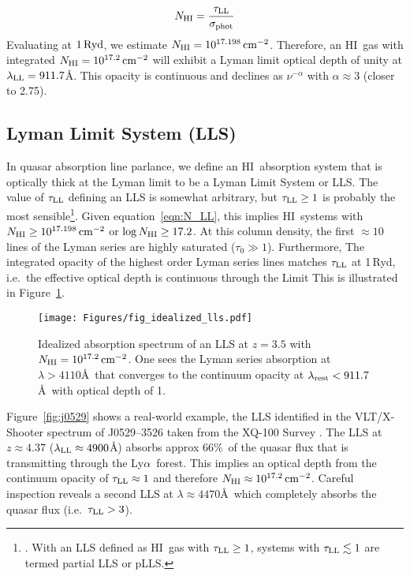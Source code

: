 \documentclass[graybox]{svmult}
\newcommand{\HI}{H{\sc I}}
\def\lya{Ly$\alpha$}
\newcommand{\mnhi}{N_{\rm HI}}
\def\cm#1{\, {\rm cm^{#1}}}
\begin{document}
\begin{equation}
N_{\rm HI} = \frac{\tau_{\rm LL}}{\sigma_{\rm phot}}
\label{eqn:N_LL}
\end{equation}
Evaluating at $1\,{\rm Ryd}$, we estimate $\mnhi = 10^{17.198} \cm{-2}$.
Therefore, an \HI\ gas with integrated $\mnhi = 10^{17.2} \cm{-2}$
will exhibit a Lyman limit optical depth of unity
at $\lambda_{\rm LL} = 911.7$\AA.  This opacity is continuous
and declines as $\nu^{-\alpha}$ with $\alpha \approx 3$ (closer to 2.75).

\subsection{Lyman Limit System (LLS)}

In quasar absorption line parlance, we define 
an \HI\ absorption system that is optically thick at the Lyman limit
to be a Lyman Limit System or LLS.
The value of $\tau_{\rm LL}$ defining an LLS is somewhat arbitrary,
but $\tau_{\rm LL} \ge 1$ is probably the most sensible\footnote{.  
With an LLS defined as \HI\ gas with $\tau_{\rm LL} \ge 1$,
systems with $\tau_{\rm LL} \lesssim 1$ are termed partial
LLS or pLLS.}.  
Given equation~\ref{eqn:N_LL},
this implies \HI\ systems with $\mnhi \ge 10^{17.198} \cm{-2}$ or 
$\log\mnhi \ge 17.2$.
At this column density, the first $\approx 10$ lines of the
Lyman series are highly saturated ($\tau_0 \gg 1$).
Furthermore, 
The integrated opacity of the highest order Lyman series lines
matches $\tau_{\rm LL}$ at 1\,Ryd,
i.e.\ the effective optical depth is continuous through the Limit
This is illustrated in Figure~\ref{fig:ideal_LLS}.

%
\begin{figure}[ht]
\sidecaption
\texttt{[image: Figures/fig\_idealized\_lls.pdf]}
%
%
\caption{Idealized absorption spectrum of an LLS at $z=3.5$
with $\mnhi = 10^{17.2} \cm{-2}$. One sees the Lyman series
absorption at $\lambda > 4110$\AA\ that converges to the
continuum opacity at $\lambda_{\rm rest} < 911.7$\AA\
with optical depth of 1.
}
\label{fig:ideal_LLS}       %
\end{figure}

Figure~\ref{fig:j0529} shows a real-world example, the
LLS identified in the VLT/X-Shooter spectrum of 
J0529--3526 taken from the XQ-100 Survey \cite[]{xq_100}.
The LLS at $z \approx 4.37$ ($\lambda_{\rm LL} \approx 4900$\AA)
absorbs approx 66\%\ of the quasar flux that is transmitting
through the \lya\ forest.  This implies an optical depth
from the continuum opacity of $\tau_{\rm LL} \approx 1$
and therefore $\mnhi \approx 10^{17.2} \cm{-2}$.
Careful inspection reveals a second LLS at $\lambda \approx 4470$\AA\
which completely absorbs the quasar flux (i.e.\ $\tau_{\rm LL} > 3$).
\end{document}
